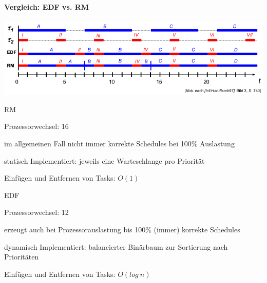 \documentclass[a4paper]{article}
\begin{document}
\begin{multicols}{3}
    \paragraph{Vergleich: EDF vs. RM}
    \begin{center}
    \includegraphics[width=.8\linewidth]{Assets/AdvancedOperatingSystems-echtzeit-edf-vs-rm.png}
    \end{center}
    \begin{itemize*}
        \item RM
        \begin{itemize*}
            \item Prozessorwechsel: 16
            \item im allgemeinen Fall nicht immer korrekte Schedules bei 100\% Auslastung
            \item statisch Implementiert: jeweils eine Warteschlange pro Priorität
            \item Einfügen und Entfernen von Tasks: $O(1)$
        \end{itemize*}
        \item EDF
        \begin{itemize*}
            \item Prozessorwechsel: 12
            \item erzeugt auch bei Prozessorauslastung bis 100\% (immer) korrekte Schedules
            \item dynamisch Implementiert: balancierter Binärbaum zur Sortierung nach Prioritäten
            \item Einfügen und Entfernen von Tasks: $O(log\ n)$
        \end{itemize*}
    \end{itemize*}


\end{multicols}
\end{document}
